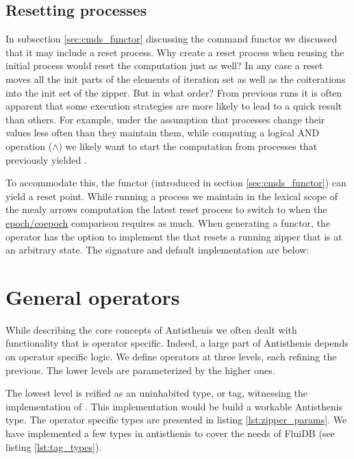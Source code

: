 \subsection{Resetting processes}
\label{sec:process_resetting}

In subsection \ref{sec:cmds_functor} discussing the command functor we
discussed that it may include a reset process. Why create a reset
process when reusing the initial process would reset the computation
just as well? In any case a reset moves all the init parts of the
elements of iteration set as well as the coiterations into the init
set of the zipper. But in what order? From previous runs it is often
apparent that some execution strategies are more likely to lead to a
quick result than others. For example, under the assumption that
processes change their values less often than they maintain them,
while computing a logical AND operation (\(\land\)) we likely want to
start the computation from processes that previously yielded
.

To accommodate this, the  functor (introduced in section
\ref{sec:cmds_functor}) can yield a reset point. While running a
process we maintain in the lexical scope of the mealy arrows
computation the latest reset process to switch to when the
\hyperref[sec:epochs_coepochs]{epoch/coepoch} comparison requires as
much. When generating a  functor, the operator has the
option to implement the  that resets a running zipper
that is at an arbitrary state. The signature and default
implementation are below:


\section{General operators}
\label{sec:antisthenis_ops}

While describing the core concepts of Antisthenis we often dealt with
functionality that is operator specific. Indeed, a large part of
Antisthenis depends on operator specific logic. We define operators at
three levels, each refining the previous. The lower levels are
parameterized by the higher ones.

The lowest level is reified as an uninhabited type, or tag, witnessing
the implementation of . This implementation would
be build a workable Antisthenis type. The operator specific types are
presented in listing \ref{lst:zipper_params}. We have implemented a few types
in antisthenis to cover the needs of FluiDB (see listing
\ref{lst:tag_types}).


